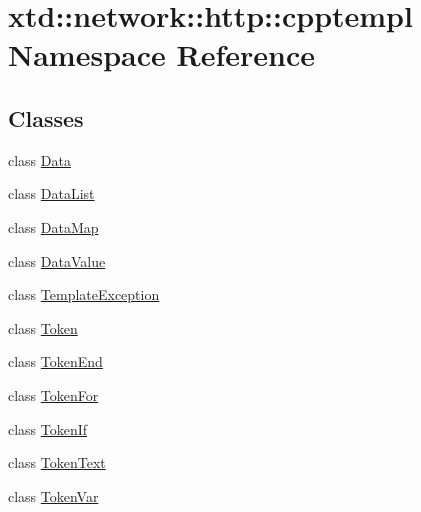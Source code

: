 \hypertarget{namespacextd_1_1network_1_1http_1_1cpptempl}{}\section{xtd\+:\+:network\+:\+:http\+:\+:cpptempl Namespace Reference}
\label{namespacextd_1_1network_1_1http_1_1cpptempl}
\subsection*{Classes}
\begin{DoxyCompactItemize}
\item 
class \hyperlink{classxtd_1_1network_1_1http_1_1cpptempl_1_1Data}{Data}
\item 
class \hyperlink{classxtd_1_1network_1_1http_1_1cpptempl_1_1DataList}{Data\+List}
\item 
class \hyperlink{classxtd_1_1network_1_1http_1_1cpptempl_1_1DataMap}{Data\+Map}
\item 
class \hyperlink{classxtd_1_1network_1_1http_1_1cpptempl_1_1DataValue}{Data\+Value}
\item 
class \hyperlink{classxtd_1_1network_1_1http_1_1cpptempl_1_1TemplateException}{Template\+Exception}
\item 
class \hyperlink{classxtd_1_1network_1_1http_1_1cpptempl_1_1Token}{Token}
\item 
class \hyperlink{classxtd_1_1network_1_1http_1_1cpptempl_1_1TokenEnd}{Token\+End}
\item 
class \hyperlink{classxtd_1_1network_1_1http_1_1cpptempl_1_1TokenFor}{Token\+For}
\item 
class \hyperlink{classxtd_1_1network_1_1http_1_1cpptempl_1_1TokenIf}{Token\+If}
\item 
class \hyperlink{classxtd_1_1network_1_1http_1_1cpptempl_1_1TokenText}{Token\+Text}
\item 
class \hyperlink{classxtd_1_1network_1_1http_1_1cpptempl_1_1TokenVar}{Token\+Var}
\end{DoxyCompactItemize}
